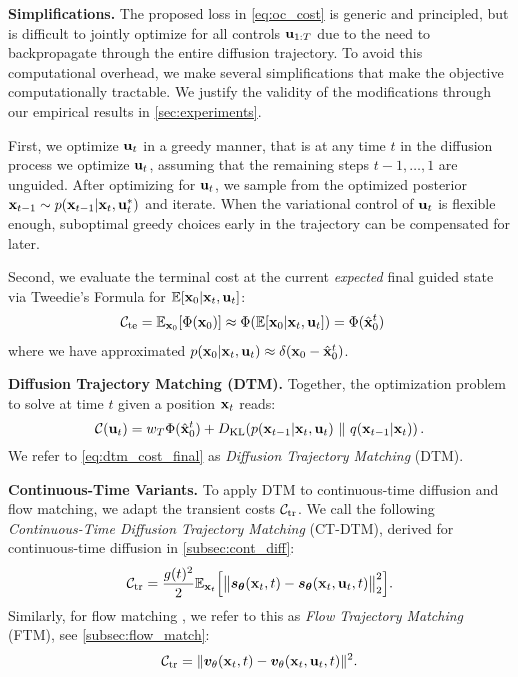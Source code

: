 \textbf{Simplifications.} The proposed loss in \cref{eq:oc_cost} is generic and principled, but is difficult to jointly optimize for all controls ${\mathbf{u}}_{1:T}$ due to the need to backpropagate through the entire diffusion trajectory. To avoid this computational overhead, we make several simplifications that make the objective computationally tractable. We justify the validity of the modifications through our empirical results in \cref{sec:experiments}.

First, we optimize ${\mathbf{u}}_t$ in a greedy manner, that is at any time $t$ in the diffusion process we optimize ${\mathbf{u}}_{t}$, assuming that the remaining steps $t-1, \dots, 1$ are unguided. After optimizing for ${\mathbf{u}}_t$, we sample from the optimized posterior ${\mathbf{x}}_{t-1} \sim p({\mathbf{x}}_{t-1}|{\mathbf{x}}_t, {\mathbf{u}}^*_t)$ and iterate. When the variational control of ${\mathbf{u}}_t$ is flexible enough, suboptimal greedy choices early in the trajectory can be compensated for later.

Second, we evaluate the terminal cost at the current \emph{expected} final guided state via Tweedie’s Formula for $\mathbb{E}[{\mathbf{x}}_0|{\mathbf{x}}_t, {\mathbf{u}}_t]$:
\begin{align}
{\mathcal{C}}_\text{te} 
= \mathbb{E}_{{\mathbf{x}}_0}[\Phi({\mathbf{x}}_0)] &
\approx \Phi(\mathbb{E}[{\mathbf{x}}_0|{\mathbf{x}}_t, {\mathbf{u}}_t])
= \Phi(\hat{{\mathbf{x}}}_0^t)
\end{align}
where we have approximated $p({\mathbf{x}}_0|{\mathbf{x}}_t, {\mathbf{u}}_t) \approx \delta({\mathbf{x}}_0 - \hat{{\mathbf{x}}}_0^t)$.

\textbf{Diffusion Trajectory Matching (DTM).} Together, the optimization problem to solve at time $t$ given a position ${\mathbf{x}}_t$ reads:
\begin{equation}
    {\mathcal{C}}({\mathbf{u}}_t) = w_T \Phi(\hat{{\mathbf{x}}}_0^t) + D_{\mathrm{KL}}\!\left(p({\mathbf{x}}_{t-1}|{\mathbf{x}}_t,{\mathbf{u}}_t) ~ \| ~ q({\mathbf{x}}_{t-1}|{\mathbf{x}}_t)\right).
    \label{eq:dtm_cost_final}
\end{equation}
We refer to \cref{eq:dtm_cost_final} as \emph{Diffusion Trajectory Matching} (DTM).

\textbf{Continuous-Time Variants.} To apply DTM to continuous-time diffusion and flow matching, we adapt the transient costs ${\mathcal{C}}_\text{tr}$. We call the following \textit{Continuous-Time Diffusion Trajectory Matching} (CT-DTM), derived for continuous-time diffusion \cite{songscore} in \cref{subsec:cont_diff}:
\begin{equation}
    {\mathcal{C}}_\text{tr} = \frac{g(t)^2}{2} \mathbb{E}_{{\mathbf{x}}_t} \Big[\big\Vert {\bm{s}}_{\bm{\theta}}({\mathbf{x}}_t, t) - {\bm{s}}_{\bm{\theta}}({\mathbf{x}}_t, {\mathbf{u}}_t, t) \big\Vert_2^2\Big].
    \label{eq:ctdtm}
\end{equation}
Similarly, for flow matching \cite{lipman2023flow,liu2023flow,albergo2023stochastic}, we refer to this as \textit{Flow Trajectory Matching} (FTM), see \cref{subsec:flow_match}:
\begin{equation}
    {\mathcal{C}}_\text{tr} = \|{\bm{v}}_\theta({\mathbf{x}}_t, t) - {\bm{v}}_\theta({\mathbf{x}}_t, {\mathbf{u}}_t, t)\|^2.
\end{equation}

